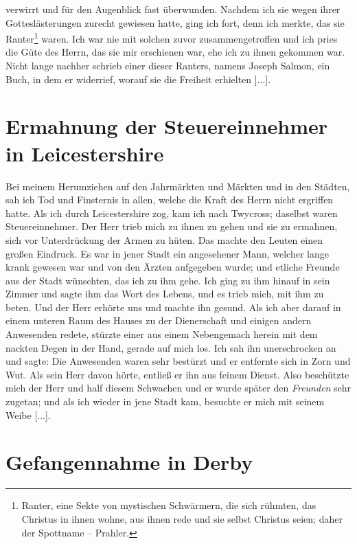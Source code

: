 verwirrt und für den Augenblick fast überwunden. Nachdem ich sie
wegen ihrer Gotteslästerungen zurecht gewiesen hatte, ging ich
fort, denn ich merkte, das sie 
Ranter\footnote{Ranter, eine Sekte von mystischen 
Schwärmern, die sich rühmten, das Christus in ihnen wohne, 
aus ihnen rede und sie selbst Christus seien; daher der 
Spottname  -- Prahler.} waren. Ich war nie
mit solchen zuvor zusammengetroffen und ich pries die Güte des
Herrn, das sie mir erschienen war, ehe ich zu ihnen gekommen
war. Nicht lange nachher schrieb einer dieser Ranters, namens
Joseph Salmon, ein Buch, in dem er 
widerrief, worauf sie die Freiheit erhielten ]...].

\section{Ermahnung der Steuereinnehmer in Leicestershire}

Bei meinem Herumziehen auf den Jahrmärkten und Märkten
und in den Städten, sah ich Tod und Finsternis in allen, welche
die Kraft des Herrn nicht ergriffen hatte. Als ich 
durch Leicestershire
zog, kam ich nach Twycross; daselbst waren Steuereinnehmer.
Der Herr trieb mich zu ihnen zu gehen und sie zu ermahnen,
sich vor Unterdrückung der Armen zu hüten. Das machte den
Leuten einen großen Eindruck. Es war in jener Stadt ein 
angesehener Mann, welcher lange krank gewesen war und von den
Ärzten aufgegeben wurde; und etliche Freunde aus der Stadt
wünschten, das ich zu ihm gehe. Ich ging zu ihm hinauf in sein
Zimmer und sagte ihm das Wort des Lebens, und es trieb mich,
mit ihm zu beten. Und der Herr erhörte uns und machte ihn
gesund. Als ich aber darauf 
in einem unteren Raum des Hauses
zu der Dienerschaft und einigen andern Anwesenden redete, stürzte
einer aus einem Nebengemach herein mit dem nackten Degen in
der Hand, gerade auf mich los. Ich sah ihn unerschrocken an
und sagte:  Die Anwesenden waren sehr bestürzt und er entfernte
sich in Zorn und Wut. Als sein Herr davon hörte, entließ er
ihn aus feinem Dienst. Also beschützte mich der Herr und half
diesem Schwachen und er wurde später den \textit{Freunden} sehr
zugetan; und als ich wieder in jene Stadt kam, besuchte er mich
mit seinem Weibe [...].

\section{Gefangennahme in Derby}

